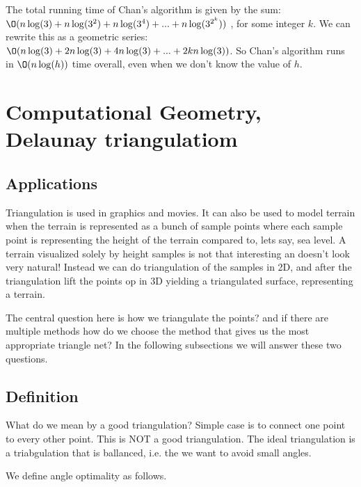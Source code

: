 \documentclass[10pt]{article}
\begin{document}
The total running time of Chan's algorithm is given by the sum: $\O(n\log(3) + n\log(3^2) + n\log(3^4) + ... + n\log(3^{2^k}))$ , for some integer $k$. We can rewrite this as a geometric series: $\O(n\log(3) + 2n\log(3) + 4n\log(3) + ... + 2kn\log(3))$. So Chan's algorithm runs in $\O(n\log(h))$ time overall, even when we don't know the value of $h$.



\clearpage \newpage
\section{Computational Geometry, Delaunay triangulatiom} %
\label{sec:computational_geometry_delaunay_triangulatiom}


\subsection{Applications} %
\label{sub:applications}
Triangulation is used in graphics and movies. It can also be used to model terrain when the terrain is represented as a bunch of sample points where each sample point is representing the height of the terrain compared to, lets say, sea level. A terrain visualized solely by height samples is not that interesting an doesn't look very natural! Instead we can do triangulation of the samples in 2D, and after the triangulation lift the points op in 3D yielding a triangulated surface, representing a terrain. 

The central question here is how we triangulate the points? and if there are multiple methods how do we choose the method that gives us the most appropriate triangle net? In the following subsections we will answer these two questions.


\subsection{Definition} %
\label{sub:definition}

What do we mean by a good triangulation?
Simple case is to connect one point to every other point. This is NOT a good triangulation. The ideal triangulation is a triabgulation that is ballanced, i.e. the we want to avoid small angles. 

We define angle optimality as follows.
\end{document}
